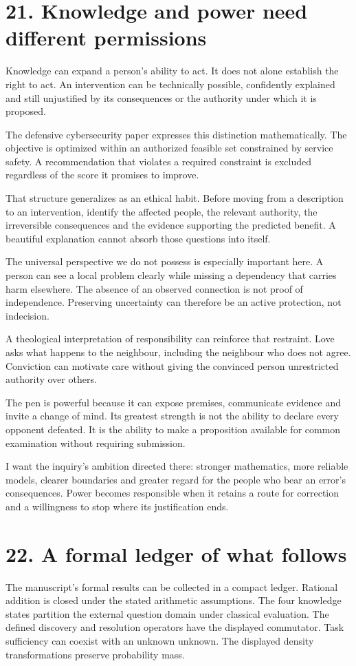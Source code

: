 \documentclass[10pt]{article}
\begin{document}
\clearpage
\section*{21. Knowledge and power need different permissions}
Knowledge can expand a person's ability to act. It does not alone establish the right to act. An intervention can be technically possible, confidently explained and still unjustified by its consequences or the authority under which it is proposed.

The defensive cybersecurity paper expresses this distinction mathematically. The objective is optimized within an authorized feasible set constrained by service safety. A recommendation that violates a required constraint is excluded regardless of the score it promises to improve.

That structure generalizes as an ethical habit. Before moving from a description to an intervention, identify the affected people, the relevant authority, the irreversible consequences and the evidence supporting the predicted benefit. A beautiful explanation cannot absorb those questions into itself.

The universal perspective we do not possess is especially important here. A person can see a local problem clearly while missing a dependency that carries harm elsewhere. The absence of an observed connection is not proof of independence. Preserving uncertainty can therefore be an active protection, not indecision.

A theological interpretation of responsibility can reinforce that restraint. Love asks what happens to the neighbour, including the neighbour who does not agree. Conviction can motivate care without giving the convinced person unrestricted authority over others.

The pen is powerful because it can expose premises, communicate evidence and invite a change of mind. Its greatest strength is not the ability to declare every opponent defeated. It is the ability to make a proposition available for common examination without requiring submission.

I want the inquiry's ambition directed there: stronger mathematics, more reliable models, clearer boundaries and greater regard for the people who bear an error's consequences. Power becomes responsible when it retains a route for correction and a willingness to stop where its justification ends.

\clearpage
\section*{22. A formal ledger of what follows}
The manuscript's formal results can be collected in a compact ledger. Rational addition is closed under the stated arithmetic assumptions. The four knowledge states partition the external question domain under classical evaluation. The defined discovery and resolution operators have the displayed commutator. Task sufficiency can coexist with an unknown unknown. The displayed density transformations preserve probability mass.
\end{document}
